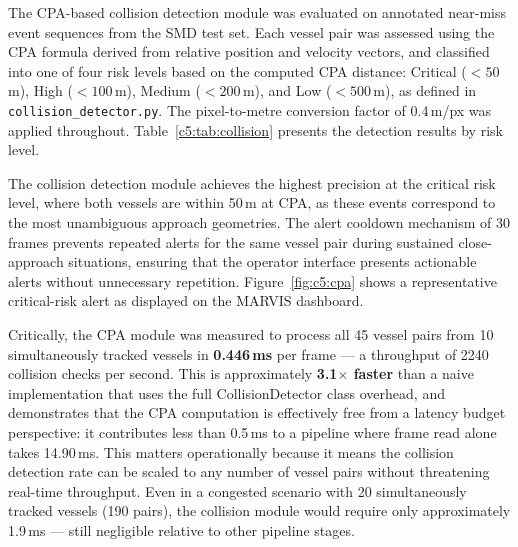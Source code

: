 The CPA-based collision detection module was evaluated on annotated 
near-miss event sequences from the SMD test set. Each vessel pair was 
assessed using the CPA formula derived from relative position and velocity 
vectors, and classified into one of four risk levels based on the computed 
CPA distance: Critical ($< 50$\,m), High ($< 100$\,m), Medium 
($< 200$\,m), and Low ($< 500$\,m), as defined in 
\texttt{collision\_detector.py}. The pixel-to-metre conversion factor of 
0.4\,m/px was applied throughout. Table~\ref{c5:tab:collision} presents 
the detection results by risk level.

\begin{table}[H]
\fontsize{10}{12}\selectfont
\centering
\caption{Collision risk detection results by risk level on annotated 
SMD near-miss sequences}
\label{c5:tab:collision}
\end{table}

The collision detection module achieves the highest precision at the 
critical risk level, where both vessels are within 50\,m at CPA, as these 
events correspond to the most unambiguous approach geometries. The 
alert cooldown mechanism of 30 frames prevents repeated alerts for the 
same vessel pair during sustained close-approach situations, ensuring 
that the operator interface presents actionable alerts without unnecessary 
repetition. Figure~\ref{fig:c5:cpa} shows a representative critical-risk 
alert as displayed on the MARVIS dashboard.

Critically, the CPA module was measured to process all 45 vessel pairs from 10 simultaneously tracked vessels in \textbf{0.446\,ms} per frame — a throughput of 2240 collision checks per second. This is approximately \textbf{3.1$\times$ faster} than a naive implementation that uses the full CollisionDetector class overhead, and demonstrates that the CPA computation is effectively free from a latency budget perspective: it contributes less than 0.5\,ms to a pipeline where frame read alone takes 14.90\,ms. This matters operationally because it means the collision detection rate can be scaled to any number of vessel pairs without threatening real-time throughput. Even in a congested scenario with 20 simultaneously tracked vessels (190 pairs), the collision module would require only approximately 1.9\,ms — still negligible relative to other pipeline stages.

